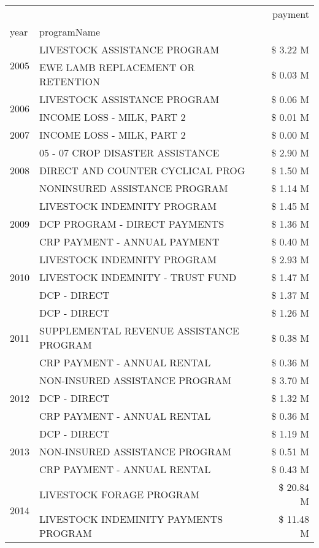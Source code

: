 \begin{tabular}{llr}
\toprule
 &  & payment \\
year & programName &  \\
\midrule
\multirow[t]{2}{*}{2005} & LIVESTOCK ASSISTANCE PROGRAM & \$ 3.22 M \\
 & EWE LAMB REPLACEMENT OR RETENTION & \$ 0.03 M \\
\cline{1-3}
\multirow[t]{2}{*}{2006} & LIVESTOCK ASSISTANCE PROGRAM & \$ 0.06 M \\
 & INCOME LOSS - MILK, PART 2 & \$ 0.01 M \\
\cline{1-3}
2007 & INCOME LOSS - MILK, PART 2 & \$ 0.00 M \\
\cline{1-3}
\multirow[t]{3}{*}{2008} & 05 - 07 CROP DISASTER ASSISTANCE & \$ 2.90 M \\
 & DIRECT AND COUNTER CYCLICAL PROG & \$ 1.50 M \\
 & NONINSURED ASSISTANCE PROGRAM & \$ 1.14 M \\
\cline{1-3}
\multirow[t]{3}{*}{2009} & LIVESTOCK INDEMNITY PROGRAM & \$ 1.45 M \\
 & DCP PROGRAM - DIRECT PAYMENTS & \$ 1.36 M \\
 & CRP PAYMENT - ANNUAL PAYMENT & \$ 0.40 M \\
\cline{1-3}
\multirow[t]{3}{*}{2010} & LIVESTOCK INDEMNITY PROGRAM & \$ 2.93 M \\
 & LIVESTOCK INDEMNITY - TRUST FUND & \$ 1.47 M \\
 & DCP - DIRECT & \$ 1.37 M \\
\cline{1-3}
\multirow[t]{3}{*}{2011} & DCP - DIRECT & \$ 1.26 M \\
 & SUPPLEMENTAL REVENUE ASSISTANCE PROGRAM & \$ 0.38 M \\
 & CRP PAYMENT - ANNUAL RENTAL & \$ 0.36 M \\
\cline{1-3}
\multirow[t]{3}{*}{2012} & NON-INSURED ASSISTANCE PROGRAM & \$ 3.70 M \\
 & DCP - DIRECT & \$ 1.32 M \\
 & CRP PAYMENT - ANNUAL RENTAL & \$ 0.36 M \\
\cline{1-3}
\multirow[t]{3}{*}{2013} & DCP - DIRECT & \$ 1.19 M \\
 & NON-INSURED ASSISTANCE PROGRAM & \$ 0.51 M \\
 & CRP PAYMENT - ANNUAL RENTAL & \$ 0.43 M \\
\cline{1-3}
\multirow[t]{3}{*}{2014} & LIVESTOCK FORAGE PROGRAM & \$ 20.84 M \\
 & LIVESTOCK INDEMINITY PAYMENTS PROGRAM & \$ 11.48 M \\

\end{tabular}
